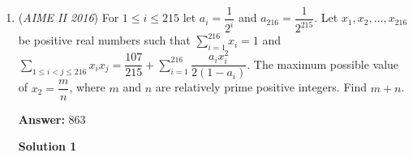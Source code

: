 \begin{enumerate}
We begin by scaling the entire diagram by a factor of $\frac{1}{50}$. We establish a coordinate system with $AC$ being the $x$-axis, where $A$ is the origin. Note that $P,Q,O$ all lie on the line $x=6, y=2\sqrt{3}$ in order to achieve the equidistant condition. Let $M$ be the midpoint of $AB$. Here is our setup:\begin{align*}A&=(0,0,0)\\B&=(6,6\sqrt{3},0)\\C&=(12,0,0)\\M&=(3,3\sqrt{3},0)\\P&=(6,2\sqrt{3},z_{1})\\Q&=(6,2\sqrt{3},z_{2})\\O&=(6,2\sqrt{3},\frac{z_{1}+z_{2}}{2})\end{align*}
Since $\overline{MP}\perp\overline{AB}$ and $\overline{MQ}\perp\overline{AB}$, $\angle PMQ$ is the dihedral angle formed by the planes of $\triangle PAB$ and $\triangle QAB$. By the distance formula and the Law of Cosine on $\triangle PMQ$, we obtain the following equations:\begin{align*}48+\frac{(z_1+z_2)^2}{4}&=\frac{(z_1-z_2)^2}{4}\\24+z_{1}^{2}+z_{2}^{2}+\sqrt{(z_{1}^{2}+12)(z_{2}^{2}+12)}&=(z_1-z_2)^2\end{align*}
We see that $z_1z_2=-48$, and the second equation simplifies to
 \[z_1^2z_2^2+32z_1z_2+144=4(z_1^2+z_2^2)\]This follows that $z_1^2+z_2^2=228$. Therefore,
 \[OP=\sqrt{\frac{(z_1-z_2)^2}{4}}=\sqrt{\frac{228+96}{4}}=9\]Scaling the distance by $50$ yields $d=9\cdot 50=\boxed{450}$, as desired.

 


	\item (\textit{AIME II 2016}) For $1 \leq i \leq 215$ let $a_i = \dfrac{1}{2^{i}}$ and $a_{216} = \dfrac{1}{2^{215}}$. Let $x_1, x_2, ..., x_{216}$ be positive real numbers such that $\sum_{i=1}^{216} x_i=1$ and $\sum_{1 \leq i < j \leq 216} x_ix_j = \dfrac{107}{215} + \sum_{i=1}^{216} \dfrac{a_i x_i^{2}}{2(1-a_i)}$. The maximum possible value of $x_2=\dfrac{m}{n}$, where $m$ and $n$ are relatively prime positive integers. Find $m+n$.


 
 \textbf{Answer: }863



\textbf{Solution 1}


\end{enumerate}
